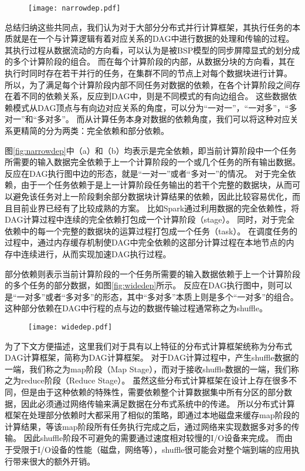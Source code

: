 \begin{figure}[!htp]
    \centering
    \texttt{[image: narrowdep.pdf]}
\end{figure}

总结归纳这些共同点，我们认为对于大部分分布式并行计算框架，其执行任务的本质就是在一个与计算逻辑有着对应关系的DAG中进行数据的处理和传输的过程。
其执行过程从数据流动的方向看，可以认为是被BSP模型的同步屏障显式的划分成的多个计算阶段的组合。
而在每个计算阶段的内部，从数据分块的方向看，其在执行时同时存在若干并行的任务，在集群不同的节点上对每个数据块进行计算。
所以，为了满足每个计算阶段内部不同任务对数据的依赖，在各个计算阶段之间存在着不同的依赖关系，反应到DAG中，则是不同模式的有向边组合。
这些数据依赖模式从DAG顶点与有向边对应关系的角度，可以分为“一对一”，“一对多”，“多对一”和“多对多”。
而从计算任务本身对数据的依赖角度，我们可以将这种对应关系更精简的分为两类：完全依赖和部分依赖。

图\ref{fig:narrowdep}中（a）和（b）均表示是完全依赖，即当前计算阶段中一个任务所需要的输入数据完全依赖于上一个计算阶段的一个或几个任务的所有输出数据。
反应在DAG执行图中边的形态，就是“一对一”或者“多对一”的情况。
对于完全依赖，由于一个任务依赖于是上一计算阶段任务输出的若干个完整的数据块，从而可以避免该任务对上一阶段剩余部分数据块计算结果的依赖，因此比较容易优化，而且目前业界已经有了比较成熟的方案。
比如Spark通过利用数据的完全依赖性，将DAG计算过程中连续的完全依赖打包成一个计算阶段（stage）。
同时，对于完全依赖中的每一个完整的数据块的运算过程打包成一个任务（task）。
在调度任务的过程中，通过内存缓存机制使DAG中完全依赖的这部分计算过程在本地节点的内存中连续进行，从而实现加速DAG执行过程。

部分依赖则表示当前计算阶段的一个任务所需要的输入数据依赖于上一个计算阶段的多个任务的部分数据，如图\ref{fig:widedep}所示。
反应在DAG执行图中，则可以是“一对多”或者“多对多”的形态，其中“多对多”本质上则是多个“一对多”的组合。
这种部分依赖在DAG中行程的点与边的数据传输过程通常称之为shuffle。

\begin{figure}[!htp]
    \centering
    \texttt{[image: widedep.pdf]}
\end{figure}

为了下文方便描述，这里我们对于具有以上特征的分布式计算框架统称为分布式DAG计算框架，简称为DAG计算框架。
对于DAG计算过程中，产生shuffle数据的一端，我们称之为map阶段（Map Stage），而对于接收shuffle数据的一端，我们称之为reduce阶段（Reduce Stage）。
虽然这些分布式计算框架在设计上存在很多不同，但是由于这种依赖的特殊性，需要依赖整个计算数据集中所有分区的部分数据，因此必须通过网络传输来满足数据在分布式系统中的传递。
所以分布式计算框架在处理部分依赖时大都采用了相似的策略，即通过本地磁盘来缓存map阶段的计算结果，等该map阶段所有任务执行完成之后，通过网络来实现数据多对多的传输。
因此shuffle阶段不可避免的需要通过速度相对较慢的I/O设备来完成。
而由于受限于I/O设备的性能（磁盘，网络等），shuffle很可能会对整个端到端的应用执行带来很大的额外开销。

